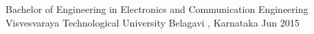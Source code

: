 

\begin{cventries}

  \cventry
    {Bachelor of Engineering in  Electronics and Communication Engineering} %
    {Visvesvaraya Technological University } %
    {Belagavi , Karnataka} %
    {Jun 2015} %
    {
      \begin{cvitems} %
       { }
      \end{cvitems}
    }

\end{cventries}
